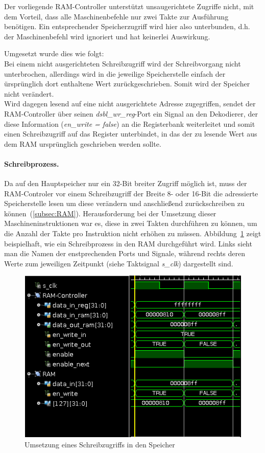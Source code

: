 Der vorliegende RAM-Controller unterstützt unsaugerichtete Zugriffe nicht, mit dem Vorteil, dass alle Maschinenbefehle nur zwei Takte zur Ausführung benötigen.
Ein entsprechender Speicherzugriff wird hier also unterbunden, d.h. der Maschinenbefehl wird ignoriert und hat keinerlei Auswirkung.

Umgesetzt wurde dies wie folgt:\\
Bei einem nicht ausgerichteten Schreibzugriff wird der Schreibvorgang nicht unterbrochen, allerdings wird in die jeweilige Speicherstelle einfach der ürsprünglich dort enthaltene Wert zurückgeschrieben.
Somit wird der Speicher nicht verändert.\\
Wird dagegen lesend auf eine nicht ausgerichtete Adresse zugegriffen, sendet der RAM-Controller über seinen \textit{dsbl\_wr\_reg}-Port ein Signal an den Dekodierer, der diese Information (\textit{en\_write = false}) an die Registerbank weiterleitet und somit einen Schreibzugriff auf das Register unterbindet, in das der zu lesende Wert aus dem RAM ursprünglich geschrieben werden sollte.

\paragraph{Schreibprozess.} 
Da auf den Hauptspeicher nur ein 32-Bit breiter Zugriff möglich ist, muss der RAM-Controler vor einem Schreibzugriff der Breite 8- oder 16-Bit die adressierte Speicherstelle lesen um diese verändern und anschließend zurückschreiben zu können~(\ref{subsec:RAM}).
Herausforderung bei der Umsetzung dieser Maschineninstruktionen war es, diese in zwei Takten durchführen zu können, um die Anzahl der Takte pro Instruktion nicht erhöhen zu müssen.
Abbildung~\ref{fig:write} zeigt beispielhaft, wie ein Schreibprozess in den RAM durchgeführt wird.
Links sieht man die Namen der enstprechenden Ports und Signale, während rechts deren Werte zum jeweiligen Zeitpunkt (siehe Taktsignal \textit{s\_clk}) dargestellt sind.

\begin{figure}[htpb]
    \includegraphics[width=\textwidth]{Figures/write.png}
    \caption{Umsetzung eines Schreibzugriffs in den Speicher}
    \label{fig:write}
\end{figure}

